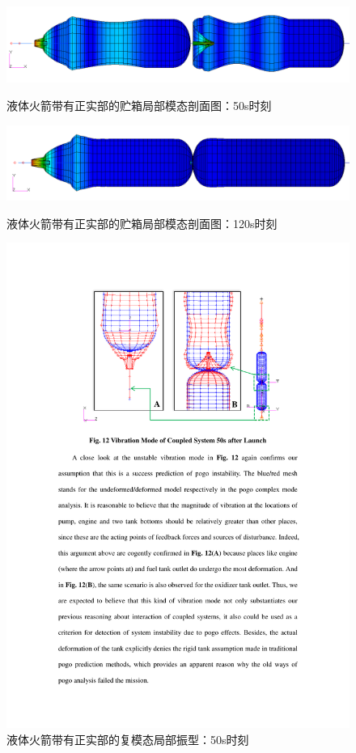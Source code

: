 \begin{figure}[p]
  \centering
  \includegraphics[width=\linewidth]{50s-Modal-Deformed.png}
  \caption{液体火箭带有正实部的贮箱局部模态剖面图：50s时刻}\label{50s-Modal-Deformed}
  \vspace{1.5em}
  \includegraphics[width=\linewidth]{120s-Modal-Deformed.png}
  \caption{液体火箭带有正实部的贮箱局部模态剖面图：120s时刻}\label{120s-Modal-Deformed}
  \vspace{1.5em}
  \includegraphics[width=\linewidth]{Deformed-Modal.pdf}
  \caption{液体火箭带有正实部的复模态局部振型：50s时刻}\label{Deformed-Modal}
\end{figure}


